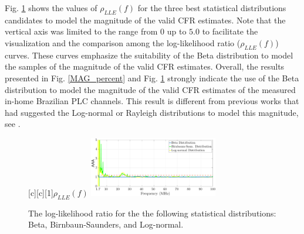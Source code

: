 \documentclass[journal]{IEEEtran}
\begin{document}
Fig. \ref{fig:Log_like} shows the values of  $\rho_{LLE}(f)$ for the three best statistical distributions candidates to model the magnitude of the valid \ac{CFR} estimates. Note that the vertical axis was limited to the range from $0$ up to $5.0$ to facilitate the visualization and the comparison among the log-likelihood ratio ($\rho_{LLE} (f)$) curves. These curves emphasize the suitability of the Beta distribution to model the samples of the magnitude of the valid \ac{CFR} estimates. Overall, the results presented in Fig. \ref{MAG_percent} and Fig. \ref{fig:Log_like} strongly indicate the use of the Beta distribution to model the magnitude of the valid \ac{CFR} estimates of the measured in-home Brazilian \ac{PLC} channels. This result is different from previous works that had suggested the Log-normal or Rayleigh distributions to model this magnitude, see \cite{Galli:Wireline,RayleighPLC}.

\begin{figure}[h!]
	\centering
	[c][1]{$\rho_{LLE} (f)$}
	\includegraphics[width=0.5\textwidth]{images/LLH_BETA_BIRN_LogN_1.7.eps}
	\caption{The log-likelihood ratio for the the following statistical distributions: Beta, Birnbaun-Saunders, and Log-normal.}
	\label{fig:Log_like}
\end{figure}
\end{document}
